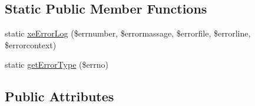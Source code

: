 \subsection*{Static Public Member Functions}
\begin{DoxyCompactItemize}
\item 
static \hyperlink{classModuleHandler_ae8a81ab7540edc526035f1375706dd7a}{xe\+Error\+Log} (\$errnumber, \$errormassage, \$errorfile, \$errorline, \$errorcontext)
\item 
static \hyperlink{classModuleHandler_a140184b247fc515e6f49eb87ff59ae74}{get\+Error\+Type} (\$errno)
\end{DoxyCompactItemize}
\subsection*{Public Attributes}
